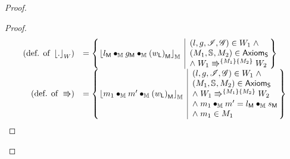 \begin{lemma}
\begin{proof}
\begin{proof}
\[\begin{array}{r l}
	
	\left(\text{def. of } \reifyW{.}	\right)
	& =
	\left\{
	\hspace*{-0.15cm}
	\begin{array}{l | l}
		\reifyH{\heapPart{l} \composeH \heapPart{g} \composeH \heapPart{\left(\localPart{w}\right)}}
		&
		\hspace*{-0.15cm}
		\begin{array}{l}
			(l, g, \lmod, \gmod) \in W_1 \;\land\\ 
			(\Hp{1}, \seq{}, \Hp{2}) \in \AxiomsSeq \\
			\land\;\repartitions{W_1}{W_2}{\Hp{1}}{\Hp{2}}
		\end{array}			
		\hspace*{-0.15cm}
	\end{array}
	\hspace*{-0.15cm}
	\right\}\\
	
	
	\left(\text{def. of } \Rrightarrow	\right)
	& =
	\left\{
	\hspace*{-0.15cm}
	\begin{array}{l | l}
		\reifyH{\h{1} \composeH \h{}' \composeH \heapPart{\left(\localPart{w}\right)}}
		&
		\hspace*{-0.15cm}
		\begin{array}{l}
			(l, g, \lmod, \gmod) \in W_1 \;\land\\ 
			(\Hp{1}, \seq{}, \Hp{2}) \in \AxiomsSeq \\
			\land\;\repartitions{W_1}{W_2}{\Hp{1}}{\Hp{2}}\\
			\land\; \h{1} \composeH \h{}' = \heapPart{l} \composeH \heapPart{s}\\
			\land\; \h{1} \in \Hp{1}
		\end{array}			
		\hspace*{-0.15cm}
	\end{array}
	\hspace*{-0.15cm}
	\right\}\\
	

\end{array}\]
\end{proof}
\end{proof}
\end{lemma}
